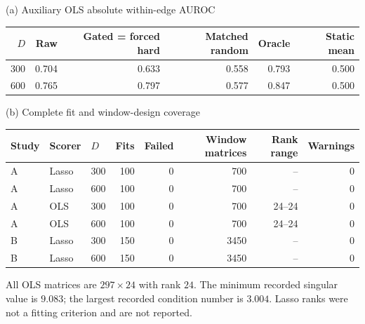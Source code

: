 \begin{minipage}{\linewidth}
\centering\small
(a) Auxiliary OLS absolute within-edge AUROC\par\medskip
\begin{tabular}{rrrrrr}
\toprule
$D$ & Raw & Gated = forced hard & Matched random & Oracle & Static mean \\
\midrule
300 & 0.704 & 0.633 & 0.558 & 0.793 & 0.500 \\
600 & 0.765 & 0.797 & 0.577 & 0.847 & 0.500 \\
\bottomrule
\end{tabular}
\par\bigskip
(b) Complete fit and window-design coverage\par\medskip
\begin{tabular}{lllrrrrr}
\toprule
Study & Scorer & $D$ & Fits & Failed & Window matrices & Rank range & Warnings \\
\midrule
A & Lasso & 300 & 100 & 0 & 700 & -- & 0 \\
A & Lasso & 600 & 100 & 0 & 700 & -- & 0 \\
A & OLS & 300 & 100 & 0 & 700 & 24--24 & 0 \\
A & OLS & 600 & 100 & 0 & 700 & 24--24 & 0 \\
B & Lasso & 300 & 150 & 0 & 3450 & -- & 0 \\
B & Lasso & 600 & 150 & 0 & 3450 & -- & 0 \\
\bottomrule
\end{tabular}
\par\medskip\raggedright\small
All OLS matrices are $297\times24$ with rank $24$. The minimum recorded singular value is $9.083$; the largest recorded condition number is $3.004$. Lasso ranks were not a fitting criterion and are not reported.
\end{minipage}
